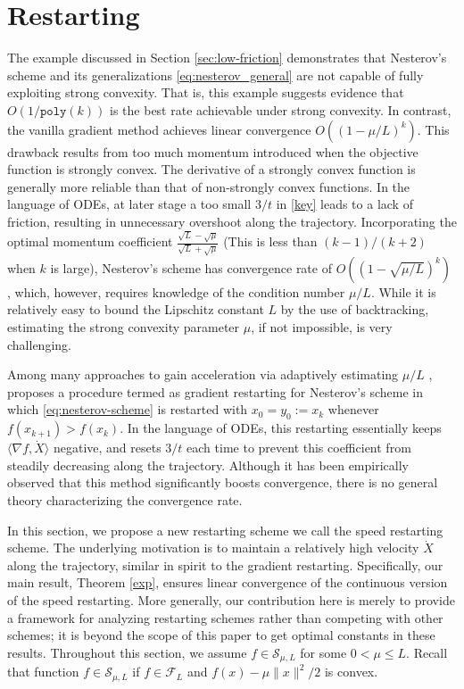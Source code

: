 \documentclass[twoside,11pt]{article}
\newcommand{\norm}[1]{\|#1\|}
\begin{document}
\section{Restarting}
\label{sec:accelerate}
The example discussed in Section \ref{sec:low-friction} demonstrates that Nesterov's scheme and its generalizations \eqref{eq:nesterov_general} are not capable of fully exploiting strong convexity. That is, this example suggests evidence that $O(1/\mathtt{poly}(k))$ is the best rate achievable under strong convexity. In contrast, the vanilla gradient method achieves linear convergence $O((1-\mu/L)^k)$. This drawback results from too much momentum introduced when the objective function is strongly convex. The derivative of a strongly convex function is generally more reliable than that of non-strongly convex functions. In the language of ODEs, at later stage a too small $3/t$ in \eqref{key} leads to a lack of friction, resulting in unnecessary overshoot along the trajectory. Incorporating the optimal momentum coefficient $\frac{\sqrt{L} - \sqrt{\mu}}{\sqrt{L} + \sqrt{\mu}}$ (This is less than $(k-1)/(k+2)$ when $k$ is large), Nesterov's scheme has convergence rate of $O((1-\sqrt{\mu/L})^k)$ \citep{nesterov-book}, which, however, requires knowledge of the condition number $\mu/L$. While it is relatively easy to bound the Lipschitz constant $L$ by the use of backtracking, estimating the strong convexity parameter $\mu$, if not impossible, is very challenging. 

Among many approaches to gain acceleration via adaptively estimating $\mu/L$ \citep[see][]{nesterov_compo}, \citet{restart} proposes a procedure termed as gradient restarting for Nesterov's scheme in which \eqref{eq:nesterov-scheme} is restarted with $x_0 = y_0 :=x_k$ whenever $f(x_{k+1}) > f(x_k)$.  In the language of ODEs, this restarting essentially keeps $\langle \nabla f,\dot{X} \rangle$ negative, and resets $3/t$ each time to prevent this coefficient from steadily decreasing along the trajectory. Although it has been empirically observed that this method significantly boosts convergence, there is no general theory characterizing the convergence rate.

In this section, we propose a new restarting scheme we call the speed restarting scheme. The underlying motivation is to maintain a
relatively high velocity $\dot X$ along the trajectory, similar in spirit to the gradient restarting. Specifically, our main result, Theorem \ref{exp}, ensures linear convergence of the continuous version of the speed restarting. More generally, our contribution here is merely to provide a framework for analyzing restarting schemes rather than competing with other schemes; it is beyond the scope of this paper to get optimal constants in these results. Throughout this section, we assume $f\in \mathcal{S}_{\mu,L}$ for some $0 < \mu \le L$. Recall that
function $f\in \mathcal{S}_{\mu,L}$ if $f\in \mathcal{F}_{L}$ and
$f(x) - \mu \norm{x}^2/2$ is convex.
\end{document}
